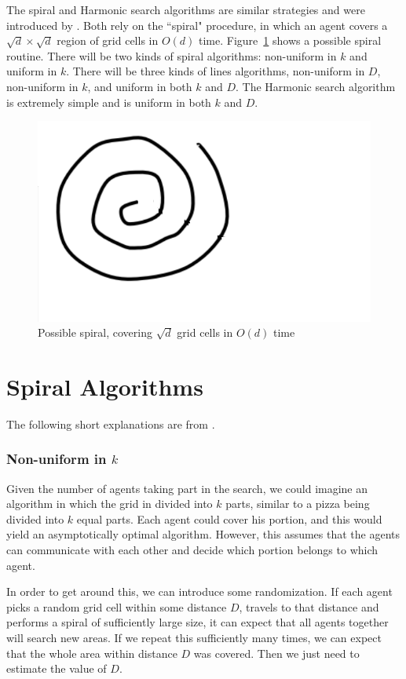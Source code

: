 \documentclass[runningheads,a4paper]{llncs}
\begin{document}
The spiral and Harmonic search algorithms are similar strategies and were introduced by \cite{feinerman2012collaborative}. Both rely on the ``spiral" procedure, in which an agent covers a $\sqrt{d} \times \sqrt{d}$ region of grid cells in $O(d)$ time. Figure~\ref{fig:spiral} shows a possible spiral routine.
There will be two kinds of spiral algorithms: non-uniform in $k$ and uniform in $k$. There will be three kinds of lines algorithms, non-uniform in $D$, non-uniform in $k$, and uniform in both $k$ and $D$. The Harmonic search algorithm is extremely simple and is uniform in both $k$ and $D$. 

\begin{figure}
\centering
\label{fig:spiral}
\includegraphics[width=0.4\linewidth]{justspiral.pdf}
\caption{Possible spiral, covering $\sqrt{d}$ grid cells in $O(d)$ time}
\end{figure}

\section{Spiral Algorithms}
\label{spiral}

The following short explanations are from \cite{feinerman2012collaborative}.

\subsubsection{Non-uniform in $k$}

Given the number of agents taking part in the search, we could imagine an algorithm in which the grid in divided into $k$ parts, similar to a pizza being divided into $k$ equal parts. Each agent could cover his portion, and this would yield an asymptotically optimal algorithm. However, this assumes that the agents can communicate with each other and decide which portion belongs to which agent. 

In order to get around this, we can introduce some randomization. If each agent picks a random grid cell within some distance $D$, travels to that distance and performs a spiral of sufficiently large size, it can expect that all agents together will search new areas. If we repeat this sufficiently many times, we can expect that the whole area within distance $D$ was covered. Then we just need to estimate the value of $D$.
\end{document}
